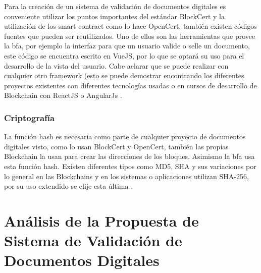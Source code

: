 Para la creación de un sistema de validación de documentos digitales es conveniente utilizar los puntos importantes   del estándar BlockCert y  la utilización de los smart contract 
como lo hace OpenCert, también existen códigos fuentes que pueden ser reutilizados. Uno de ellos
son las herramientas que provee la  \gls{bfa}, por ejemplo la interfaz para que un usuario valide o selle un documento, este
código se encuentra escrito en VueJS, por lo que se optará
su uso para el desarrollo de la vista del usuario. Cabe aclarar que se puede realizar con cualquier otro framework (esto se puede
demostrar encontrando los diferentes proyectos existentes con diferentes tecnologías usadas o en cursos de desarrollo de  Blockchain con ReactJS 
o AngularJs \cite[]{Blockchain_federal_argentina_bfa_2020}. 

\subsubsection{Criptografía}
La función hash es necesaria como parte de cualquier proyecto de documentos digitales visto, como lo usan BlockCert y OpenCert, también
las propias  Blockchain la usan para crear las direcciones de los bloques. Asimismo la \gls{bfa} usa esta función hash. 
Existen diferentes tipos como MD5, SHA y sus variaciones  por lo general en las Blockchains y 
en los sistemas o aplicaciones utilizan SHA-256, por su uso extendido  se elije esta última \cite[]{satoh_asic-hardware-focused_2007}.



\section{Análisis de la Propuesta de Sistema de Validación de Documentos Digitales}

